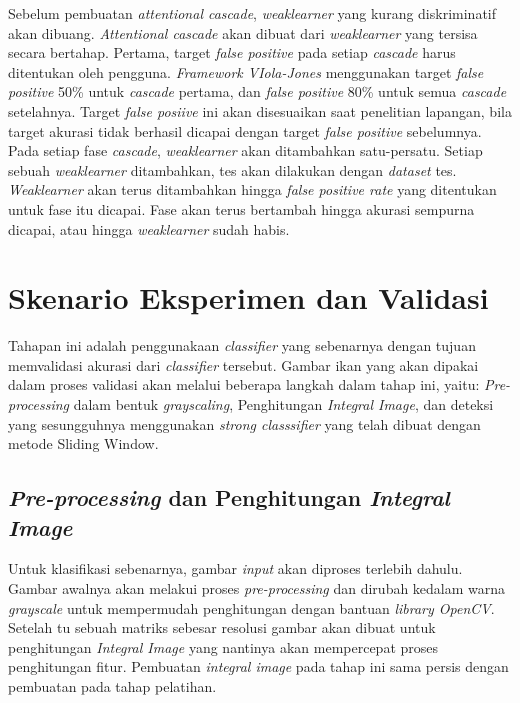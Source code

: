 Sebelum pembuatan \emph{attentional cascade}, \emph{weaklearner} yang kurang 
diskriminatif akan dibuang. 
\emph{Attentional cascade} akan dibuat dari \emph{weaklearner} 
yang tersisa secara bertahap. 
Pertama, target \textit{false positive} pada setiap \emph{cascade} 
harus ditentukan oleh pengguna. \emph{Framework VIola-Jones} menggunakan target 
\textit{false positive} 50\% untuk \emph{cascade} pertama, dan 
\textit{false positive} 80\% untuk semua \emph{cascade} setelahnya.
Target \textit{false posiive} ini akan disesuaikan 
saat penelitian lapangan, bila target akurasi tidak berhasil dicapai 
dengan target \textit{false positive} sebelumnya.
Pada setiap fase \emph{cascade}, \emph{weaklearner} akan 
ditambahkan satu-persatu. Setiap sebuah \emph{weaklearner} ditambahkan, tes akan dilakukan 
dengan \emph{dataset} tes. \emph{Weaklearner} akan terus ditambahkan hingga \emph{false positive rate} 
yang ditentukan untuk fase itu dicapai. Fase akan terus bertambah hingga 
akurasi sempurna dicapai, atau hingga \emph{weaklearner} sudah habis. 


\section{Skenario Eksperimen dan Validasi}

Tahapan ini adalah penggunakaan \emph{classifier} yang sebenarnya dengan tujuan 
memvalidasi akurasi dari \emph{classifier} tersebut. 
Gambar ikan yang akan dipakai dalam proses validasi akan 
melalui beberapa langkah dalam tahap ini, 
yaitu: \textit{Pre-processing} dalam bentuk \emph{grayscaling}, Penghitungan 
\emph{Integral Image}, dan deteksi yang sesungguhnya menggunakan \emph{strong classsifier} 
yang telah dibuat dengan metode Sliding Window.

\subsection{\textit{Pre-processing} dan Penghitungan \emph{Integral Image}}

Untuk klasifikasi sebenarnya, gambar \emph{input} akan diproses terlebih dahulu. 
Gambar awalnya akan melakui proses \textit{pre-processing} dan dirubah kedalam warna 
\emph{grayscale} %
untuk mempermudah penghitungan dengan bantuan \emph{library OpenCV}. 
Setelah tu sebuah matriks sebesar resolusi gambar akan dibuat untuk 
penghitungan \emph{Integral Image} yang nantinya akan mempercepat proses 
penghitungan fitur. Pembuatan \emph{integral image} pada tahap ini sama persis 
dengan pembuatan pada tahap pelatihan.

